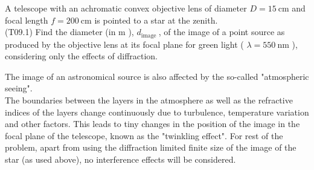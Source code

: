 \documentclass[10pt]{article}
\begin{document}
    A telescope with an achromatic convex objective lens of diameter $D=15 \mathrm{~cm}$ and focal length $f=200 \mathrm{~cm}$ is pointed to a star at the zenith.\\
    (T09.1) Find the diameter (in m ), $d_{\text {image }}$, of the image of a point source as produced by the objective lens at its focal plane for green light ( $\lambda=550 \mathrm{~nm}$ ), considering only the effects of diffraction.
    
    The image of an astronomical source is also affected by the so-called "atmospheric seeing".\\
    The boundaries between the layers in the atmosphere as well as the refractive indices of the layers change continuously due to turbulence, temperature variation and other factors. This leads to tiny changes in the position of the image in the focal plane of the telescope, known as the "twinkling effect". For rest of the problem, apart from using the diffraction limited finite size of the image of the star (as used above), no interference effects will be considered.
    
\end{document}
